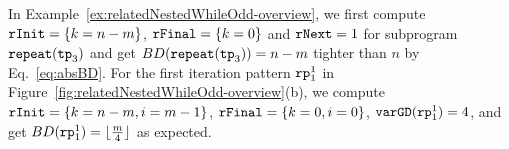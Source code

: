 In Example~\ref{ex:relatedNestedWhileOdd-overview}, we first compute $\mathtt{rInit} = \{k = n - m\}$, $\mathtt{rFinal} = \{k = 0\}$ and $\mathtt{rNext} = 1$ for subprogram $\mathtt{repeat}(\mathtt{tp}_3)$ and get $BD(\mathtt{repeat}(\mathtt{tp}_3)) = n - m$ tighter than $n$ by Eq.~\ref{eq:absBD}.
For the first iteration pattern $\mathtt{rp}_1^1$ in Figure~\ref{fig:relatedNestedWhileOdd-overview}(b), we compute 
$\mathtt{rInit} = \{k = n - m, i = m - 1\}$, $\mathtt{rFinal} = \{k = 0, i = 0\}$, $\mathtt{varGD}(\mathtt{rp}_1^1) = 4$, and get $BD(\mathtt{rp}_1^1) = \lfloor \frac{m}{4} \rfloor $ as expected.

